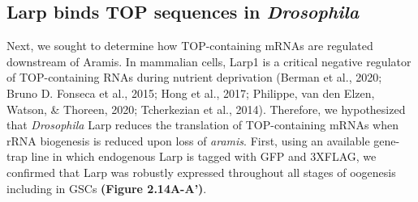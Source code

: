 \documentclass[12pt,oneside]{reedthesis}
\begin{document}
\setlength\parindent{24pt}

\textbf{\hfill\break
}

\hypertarget{larp-binds-top-sequences-in-drosophila}{%
\subsection{\texorpdfstring{Larp binds TOP sequences in \emph{Drosophila}}{Larp binds TOP sequences in Drosophila}}\label{larp-binds-top-sequences-in-drosophila}}

Next, we sought to determine how TOP-containing mRNAs are regulated downstream of Aramis. In mammalian cells, Larp1 is a critical negative regulator of TOP-containing RNAs during nutrient deprivation (Berman et al., 2020; Bruno D. Fonseca et al., 2015; Hong et al., 2017; Philippe, van den Elzen, Watson, \& Thoreen, 2020; Tcherkezian et al., 2014). Therefore, we hypothesized that \emph{Drosophila} Larp reduces the translation of TOP-containing mRNAs when rRNA biogenesis is reduced upon loss of \emph{aramis}. First, using an available gene-trap line in which endogenous Larp is tagged with GFP and 3XFLAG, we confirmed that Larp was robustly expressed throughout all stages of oogenesis including in GSCs \textbf{(Figure 2.14A-A')}.
\end{document}
